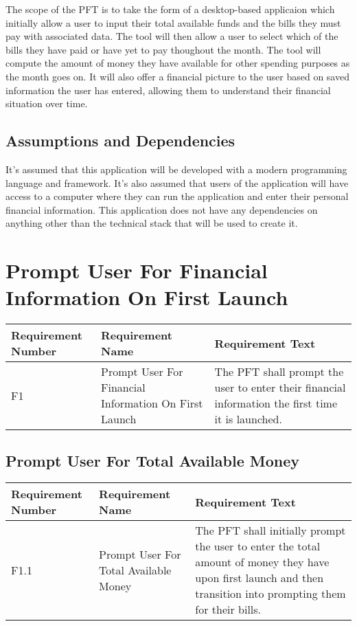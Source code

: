 \documentclass{article}
\begin{document}
The scope of the PFT is to take the form of a desktop-based applicaion which initially allow a user to input their total available funds and the bills they must pay with associated data. The tool will then allow a user to select which of the bills they have paid or have yet to pay thoughout the month.
The tool will compute the amount of money they have available for other spending purposes as the month goes on. It will also offer a financial picture to the user based on saved information the user has entered, allowing them to understand
their financial situation over time.

\subsection{Assumptions and Dependencies}

It's assumed that this application will be developed with a modern programming language and framework. It's also assumed that users of the application
will have access to a computer where they can run the application and enter their personal financial information. This application does not have any dependencies on anything other than the technical stack that will be used to create it.

\section{Prompt User For Financial Information On First Launch}

\begin{longtable}{|p{2cm}|p{6cm}| p{6cm}|}
    \hline
    \textbf{Requirement Number} & \textbf{Requirement Name} & \textbf{Requirement Text}\\
    \hline
    F1 & Prompt User For Financial Information On First Launch & The PFT shall prompt the user to enter their financial information the first time it is launched. \\
    \hline
\end{longtable}

\subsection{Prompt User For Total Available Money}

\begin{longtable}{|p{2cm}|p{6cm}| p{6cm}|}
    \hline
    \textbf{Requirement Number} & \textbf{Requirement Name} & \textbf{Requirement Text}\\
    \hline
    F1.1 & Prompt User For Total Available Money & The PFT shall initially prompt the user to enter the total amount of money they have upon first launch and then transition into prompting them for their bills. \\
    \hline
\end{longtable}
\end{document}
